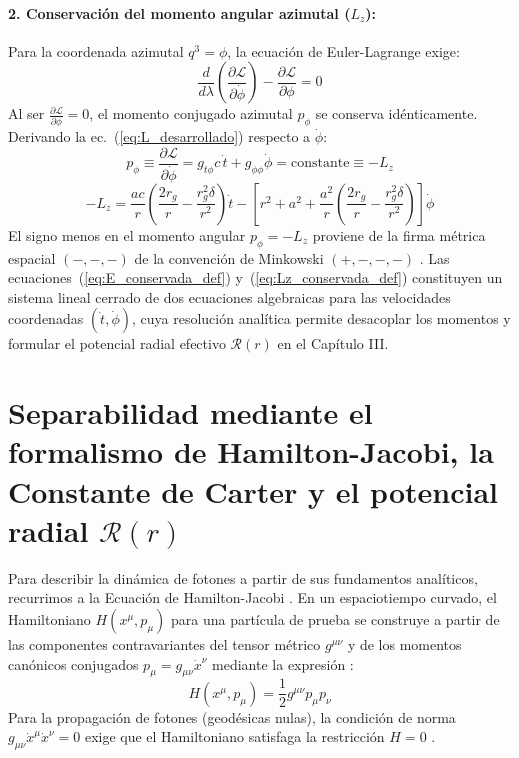\paragraph{2. Conservación del momento angular azimutal ($L_z$):}
Para la coordenada azimutal $q^3 = \phi$, la ecuación de Euler-Lagrange exige:
\begin{equation}
    \frac{d}{d\lambda}\left( \frac{\partial \mathcal{L}}{\partial \dot{\phi}} \right) - \frac{\partial \mathcal{L}}{\partial \phi} = 0
    \label{eq:euler_lagrange_phi}
\end{equation}
Al ser $\frac{\partial \mathcal{L}}{\partial \phi} = 0$, el momento conjugado azimutal $p_\phi$ se conserva idénticamente. Derivando la ec.~(\ref{eq:L_desarrollado}) respecto a $\dot{\phi}$:
\begin{equation}
    p_\phi \equiv \frac{\partial \mathcal{L}}{\partial \dot{\phi}} = g_{t\phi} c \, \dot{t} + g_{\phi\phi} \dot{\phi} = \text{constante} \equiv -L_z
    \label{eq:Lz_conservada_paso1}
\end{equation}
\begin{equation}
    -L_z = \frac{a c}{r}\left(\frac{2r_g}{r} - \frac{r_g^2 \delta}{r^2}\right) \dot{t} - \left[ r^2 + a^2 + \frac{a^2}{r}\left(\frac{2r_g}{r} - \frac{r_g^2 \delta}{r^2}\right) \right] \dot{\phi}
    \label{eq:Lz_conservada_def}
\end{equation}
El signo menos en el momento angular $p_\phi = -L_z$ proviene de la firma métrica espacial $(-,-,-)$ de la convención de Minkowski $(+,-,-,-)$ \citep{05villegas, M_P_Hobson_General_Relativity}. Las ecuaciones~(\ref{eq:E_conservada_def}) y~(\ref{eq:Lz_conservada_def}) constituyen un sistema lineal cerrado de dos ecuaciones algebraicas para las velocidades coordenadas $(\dot{t}, \dot{\phi})$, cuya resolución analítica permite desacoplar los momentos y formular el potencial radial efectivo $\mathcal{R}(r)$ en el Capítulo III.

\section{Separabilidad mediante el formalismo de Hamilton-Jacobi, la Constante de Carter y el potencial radial \texorpdfstring{$\mathcal{R}(r)$}{R(r)}}

Para describir la dinámica de fotones a partir de sus fundamentos analíticos, recurrimos a la Ecuación de Hamilton-Jacobi \citep{pdfcoffee.com_chandrasekhar, 05villegas}. En un espaciotiempo curvado, el Hamiltoniano $H(x^\mu, p_\mu)$ para una partícula de prueba se construye a partir de las componentes contravariantes del tensor métrico $g^{\mu\nu}$ y de los momentos canónicos conjugados $p_\mu = g_{\mu\nu} \dot{x}^\nu$ mediante la expresión \citep{05villegas}:
\begin{equation}
    H(x^\mu, p_\mu) = \frac{1}{2} g^{\mu\nu} p_\mu p_\nu
    \label{eq:hamiltoniano_gen}
\end{equation}
Para la propagación de fotones (geodésicas nulas), la condición de norma $g_{\mu\nu}\dot{x}^\mu\dot{x}^\nu = 0$ exige que el Hamiltoniano satisfaga la restricción $H = 0$ \citep{05villegas, chaos_fractals_photon_ring}.

